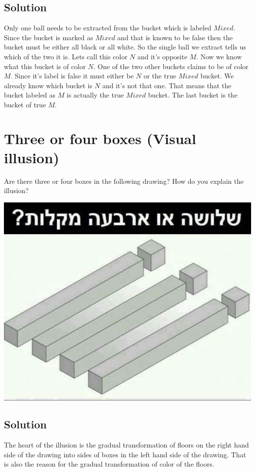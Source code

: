 \documentclass{article}
\begin{document}
\subsection{Solution}
Only one ball needs to be extracted from the bucket which is labeled $Mixed$. Since the bucket is marked as $Mixed$ and that is known to be false then the bucket must be either all black or all white. So the single ball we extract tells us which of the two it is. Lets call this color $N$ and it's opposite $M$. Now we know what this bucket is of color $N$. One of the two other buckets claims to be of color $M$. Since it's label is false it must either be $N$ or the true $Mixed$ bucket. We already know which bucket is $N$ and it's not that one. That means that the bucket labeled as $M$ is actually the true $Mixed$ bucket. The last bucket is the bucket of true $M$.

\section {Three or four boxes (Visual illusion)}
Are there three or four boxes in the following drawing? How do you explain the illusion?

\includegraphics[scale=.5]{src/jpg/3-4-sticks.jpg}

\subsection{Solution}
The heart of the illusion is the gradual transformation of floors on the right hand side of the drawing into sides of boxes in the left hand side of the drawing. That is also the reason for the gradual transformation of color of the floors.

\label{end}
\end{document}
